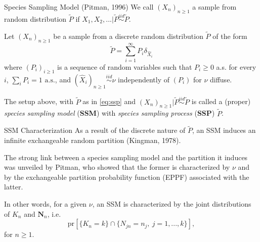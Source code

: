 \documentclass[11pt, handout]{beamer}
\begin{document}
\begin{frame}{Species Sampling Model (Pitman, 1996)}
    We call \((X_n)_{n \geq 1}\) a sample from random distribution \(\tilde{P}\) if \(X_1,X_2,... | \tilde{P} \overset{iid}{\sim} \tilde{P}\).
    \begin{definition}
        \label{th:ssm}
        Let \((X_n)_{n \geq 1}\) be a sample from a discrete random distribution \(\tilde{P}\) of the form
        \begin{equation}
            \label{eq:ssp}
            \tilde{P} = \sum_{i = 1}^{\infty} P_{i} \delta_{\hat{X}_i}
        \end{equation}
        where \((P_i)_{i \geq 1}\) is a sequence of random variables such that \(P_i \geq 0\) a.s. for every \(i\), \(\sum_i P_i = 1 \text{ a.s.}\), and \((\hat{X}_i)_{n \geq 1} \overset{iid}{\sim} \nu\) independently of \((P_i)\) for \(\nu\) diffuse.
    \end{definition}
    \medskip
    \pause
    The setup above, with \(\tilde{P}\) as in \eqref{eq:ssp} and \((X_n)_{n \geq 1} | \tilde{P} \overset{iid}{\sim} \tilde{P}\) is called a (proper) \textit{species sampling model} (\textbf{SSM}) with \textit{species sampling process} (\textbf{SSP}) \(\tilde{P}\).
\end{frame}

\begin{frame}{SSM Characterization}
    As a result of the discrete nature of \(\tilde{P}\), an SSM induces an infinite exchangeable random partition (Kingman, 1978).
    \medskip
    
    The strong link between a species sampling model and the partition it induces was unveiled by Pitman, who showed that the former is characterized by \(\nu\) and by the exchangeable partition probability function (EPPF) associated with the latter. 
    \medskip
    
    In other words, for a given \(\nu\), an SSM is characterized by the joint distributions of \(K_n\) and \(\mathbf{N}_n\), i.e.
    \begin{equation*}
        \text{pr}[\{K_n = k\} \cap \{N_{jn} = n_j,\ j = 1,...,k\}],
    \end{equation*}
    for \(n \geq 1\).
\end{frame}
\end{document}
